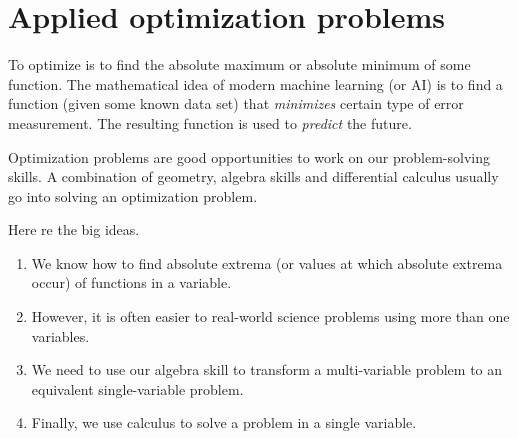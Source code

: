 \documentclass[../main.tex]{subfiles}
\begin{document}
 \section{Applied optimization problems}
To optimize is to find the absolute maximum or absolute minimum of some function. The mathematical idea of modern machine learning (or AI) is to find a function (given some known data set) that \emph{minimizes} certain type of error measurement. The resulting function is used to \emph{predict} the future.

Optimization problems are good opportunities to work on our problem-solving skills. A combination of geometry, algebra skills and differential calculus usually go into solving an optimization problem.

Here re the big ideas.
\begin{enumerate}[label=(\alph*)]
  \item We know how to find absolute extrema (or values at which absolute extrema occur) of functions in a  variable.

  \item However, it is often easier to  real-world science problems using more than one variables.

  \item We need to use our algebra skill to transform a multi-variable problem to an equivalent single-variable problem.

  \item Finally, we use calculus to solve a problem in a single variable.
\end{enumerate}
\end{document}
